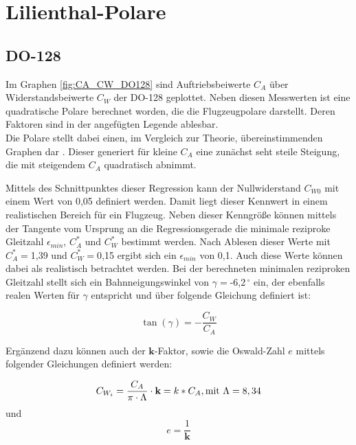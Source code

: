 \section{Lilienthal-Polare}

\subsection{DO-128}

Im Graphen \ref{fig:CA_CW_DO128} sind  Auftriebsbeiwerte $C_A$ über Widerstandsbeiwerte $C_W$ der DO-128 geplottet. Neben diesen Messwerten ist eine quadratische Polare berechnet worden, die die Flugzeugpolare darstellt. Deren Faktoren sind in der angefügten Legende ablesbar. \\ Die Polare stellt dabei einen, im Vergleich zur Theorie, übereinstimmenden Graphen dar \cite{Kurzskript}. Dieser generiert für kleine $C_A$ eine zunächst seht steile Steigung, die mit steigendem $C_A$ quadratisch abnimmt. 

Mittels des Schnittpunktes dieser Regression kann der Nullwiderstand $C_{W0}$ mit einem Wert von 0,05 definiert werden. Damit liegt dieser Kennwert in einem realistischen Bereich für ein Flugzeug. Neben dieser Kenngröße können mittels der Tangente vom Ursprung an die Regressionsgerade die minimale reziproke Gleitzahl $\epsilon_{min}$, $C_A^*$ und $C_W^*$ bestimmt werden. Nach Ablesen dieser Werte mit $C_A^*=$1,39 und $C_W^*=$0,15 ergibt sich ein $\epsilon_{min}$ von 0,1. Auch diese Werte können dabei als realistisch betrachtet werden. Bei der berechneten minimalen reziproken Gleitzahl stellt sich ein Bahnneigungswinkel von $\gamma=$-6,2$^{\ \circ}$ ein, der ebenfalls realen Werten für $\gamma$ entspricht und über folgende Gleichung definiert ist:

\begin{equation}
\tan\left(\gamma\right)=-\frac{C_W}{C_A}
\end{equation}

Ergänzend dazu können auch der $\textbf{k}$-Faktor, sowie die Oswald-Zahl $e$ mittels folgender Gleichungen definiert werden:

\begin{equation}
C_{W_{i}}=\frac{C_A}{\pi \cdot \Lambda}\cdot \textbf{k}=k*C_A, \\ \mathrm{mit} \ \Lambda=8,34 
\label{eq:C_W_i}
\end{equation}
und
\begin{equation}
e=\frac{1}{\textbf{k}}
\end{equation}

